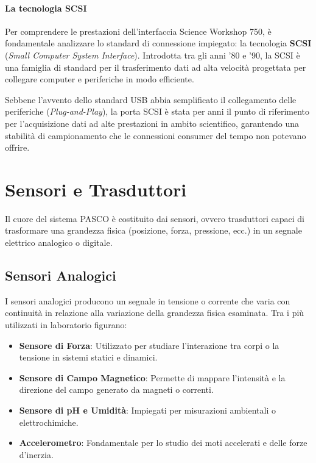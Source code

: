 \documentclass[12pt, letterpaper]{book}
\begin{document}
  \paragraph{La tecnologia SCSI}

  Per comprendere le prestazioni dell'interfaccia Science Workshop 750, è fondamentale analizzare lo standard di connessione impiegato: la tecnologia \textbf{SCSI} (\textit{Small Computer System Interface}). Introdotta tra gli anni '80 e '90, la SCSI è una famiglia di standard per il trasferimento dati ad alta velocità progettata per collegare computer e periferiche in modo efficiente.

  Sebbene l'avvento dello standard USB abbia semplificato il collegamento delle periferiche (\textit{Plug-and-Play}), la porta SCSI è stata per anni il punto di riferimento per l'acquisizione dati ad alte prestazioni in ambito scientifico, garantendo una stabilità di campionamento che le connessioni consumer del tempo non potevano offrire.

  \section{Sensori e Trasduttori}
  Il cuore del sistema PASCO è costituito dai sensori, ovvero trasduttori capaci di trasformare una grandezza fisica (posizione, forza, pressione, ecc.) in un segnale elettrico analogico o digitale.

    \subsection{Sensori Analogici}
    I sensori analogici producono un segnale in tensione o corrente che varia con continuità in relazione alla variazione della grandezza fisica esaminata. Tra i più utilizzati in laboratorio figurano:
    \begin{itemize}
        \item \textbf{Sensore di Forza}: Utilizzato per studiare l'interazione tra corpi o la tensione in sistemi statici e dinamici.
        \item \textbf{Sensore di Campo Magnetico}: Permette di mappare l'intensità e la direzione del campo generato da magneti o correnti.
        \item \textbf{Sensore di pH e Umidità}: Impiegati per misurazioni ambientali o elettrochimiche.
        \item \textbf{Accelerometro}: Fondamentale per lo studio dei moti accelerati e delle forze d'inerzia.
    \end{itemize}
\end{document}
